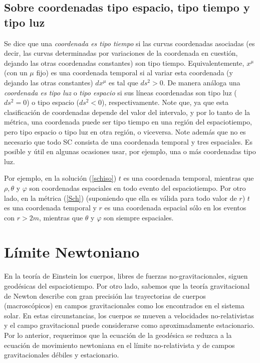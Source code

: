\subsection{Sobre coordenadas tipo espacio, tipo tiempo y tipo luz}

Se dice que una \textit{coordenada es tipo tiempo} si las curvas coordenadas asociadas (es decir, las curvas determinadas por variaciones de la coordenada en cuestión, dejando las otras coordenadas constantes) son tipo tiempo. Equivalentemente, $x^\mu$ (con un $\mu$ fijo) es una coordenada temporal si al variar esta coordenada (y dejando las otras constantes) $dx^\mu$ es tal que $ds^2>0$. De manera análoga una \textit{coordenada es tipo luz} o \textit{tipo espacio} si sus líneas coordenadas son tipo luz ($ds^2=0$) o tipo espacio ($ds^2<0$), respectivamente. Note que, ya que esta clasificación de coordenadas depende del valor del intervalo, y por lo tanto de la métrica, una coordenada puede ser tipo tiempo en una región del espaciotiempo, pero tipo espacio o tipo luz en otra región, o viceversa. Note además que no es necesario que todo SC consista de una coordenada temporal y tres espaciales. Es posible y útil en algunas ocasiones usar, por ejemplo, una o más coordenadas tipo luz.

Por ejemplo, en la solución (\ref{schiso}) $t$ es una coordenada temporal, mientras que $\rho, \theta$ y $\varphi$ son coordenadas espaciales en todo evento del espaciotiempo. Por otro lado, en la métrica (\ref{Sch})  (suponiendo que ella es válida para todo valor de $r$) $t$ es una coordenada temporal y $r$ es una coordenada espacial sólo en los eventos con $r>2m$, mientras que $\theta$ y $\varphi$ son siempre espaciales.


\section{Límite Newtoniano}

En la teoría de Einstein los cuerpos, libres de fuerzas no-gravitacionales, siguen geodésicas del espaciotiempo.
Por otro lado, sabemos que la teoría gravitacional de Newton describe con
gran precisión las trayectorias de cuerpos (macroscópicos) en campos
gravitacionales como los encontrados en el sistema solar. En estas
circunstancias, los cuerpos se mueven a velocidades no-relativistas y el campo gravitacional puede considerarse como aproximadamente estacionario. Por lo
anterior, requerimos que la ecuación de la geodésica se reduzca a la
ecuación de movimiento newtoniana en el límite no-relativista y de campos
gravitacionales débiles y estacionario.

